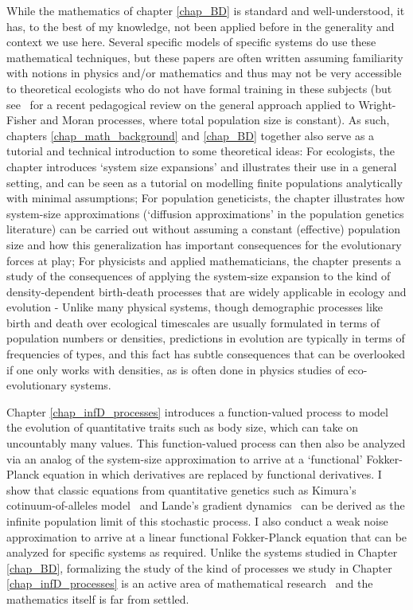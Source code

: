 While the mathematics of chapter \ref{chap_BD} is standard and well-understood, it has, to the best of my knowledge, not been applied before in the generality and context we use here. Several specific models of specific systems do use these mathematical techniques, but these papers are often written assuming familiarity with notions in physics and/or mathematics and thus may not be very accessible to theoretical ecologists who do not have formal training in these subjects (but see~\citet{czuppon_understanding_2021} for a recent pedagogical review on the general approach applied to Wright-Fisher and Moran processes, where total population size is constant). As such, chapters \ref{chap_math_background} and \ref{chap_BD} together also serve as a tutorial and technical introduction to some theoretical ideas: For ecologists, the chapter introduces `system size expansions' and illustrates their use in a general setting, and can be seen as a tutorial on modelling finite populations analytically with minimal assumptions; For population geneticists, the chapter illustrates how system-size approximations (`diffusion approximations' in the population genetics literature) can be carried out without assuming a constant (effective) population size and how this generalization has important consequences for the evolutionary forces at play; For physicists and applied mathematicians, the chapter presents a study of the consequences of applying the system-size expansion to the kind of density-dependent birth-death processes that are widely applicable in ecology and evolution - Unlike many physical systems, though demographic processes like birth and death over ecological timescales are usually formulated in terms of population numbers or densities, predictions in evolution are typically in terms of frequencies of types, and this fact has subtle consequences that can be overlooked if one only works with densities, as is often done in physics studies of eco-evolutionary systems.

Chapter \ref{chap_infD_processes} introduces a function-valued process to model the evolution of quantitative traits such as body size, which can take on uncountably many values. This function-valued process can then also be analyzed via an analog of the system-size approximation to arrive at a `functional' Fokker-Planck equation in which derivatives are replaced by functional derivatives. I show that classic equations from quantitative genetics such as Kimura's cotinuum-of-alleles model~\citep{kimura_stochastic_1965} and Lande's gradient dynamics~\citep{lande_quantitative_1982} can be derived as the infinite population limit of this stochastic process. I also conduct a weak noise approximation to arrive at a linear functional Fokker-Planck equation that can be analyzed for specific systems as required. Unlike the systems studied in Chapter \ref{chap_BD}, formalizing the study of the kind of processes we study in Chapter \ref{chap_infD_processes} is an active area of mathematical research~\citep{carmona_stochastic_1999,da_prato_stochastic_2014,prevot_concise_2007,liu_stochastic_2015,bogachev_fokker-planck-kolmogorov_2015,balan_gentle_2018} and the mathematics itself is far from settled.

